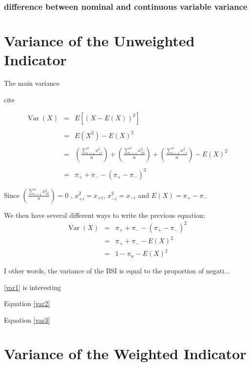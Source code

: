 \documentclass[12pt,a4paper,oneside]{book}
\DeclareMathOperator{\Var}{Var}
\begin{document}
\subsubsection{difference between nominal and continuous variable variance}


\section{Variance of the Unweighted Indicator}

The main variance

cite

\begin{eqnarray}
     \Var(X) &=& E \left[ \left(X-E(X) \right)^2 \right] \nonumber \\ \nonumber \\
     &=& E\left( X^2\right) - E\left( X\right)^2 \nonumber \\ \nonumber \\
     &=& \left( \frac{\sum_{i=1}^n x_{+i}^2}{n} \right) + \left( \frac{\sum_{i=1}^n x_{Ni}^2}{n} \right) + \left( \frac{\sum_{i=1}^n x_{-i}^2}{n} \right) - E(X)^2  \nonumber \\ \nonumber \\
     &=& \pi_+ + \pi_- - ( \pi_+ - \pi_- )^2 \label{var1}
\end{eqnarray}

Since $\left( \frac{\sum_{i=1}^n x_{Ni}^2}{n} \right) = 0$ ,
$x_{+i}^2 = x_{+i}$, $x_{-i}^2 = x_{-i}$
and $E(X) = \pi_+ - \pi_-$


We then have several different ways to write the previous equation;
\begin{eqnarray}
\Var(X) &=& \pi_+ + \pi_- - ( \pi_+ - \pi_- )^2 \nonumber \\
	&=& \pi_+ + \pi_- - E ( X )^2 \label{var2} \\
	&=& 1 - \pi_n - E(X)^2 \label{var3}
\end{eqnarray}

I other words, the variance of the BSI is equal to the proportion of negati...

\autoref{var1} is interesting 

Equation \ref{var2}

Equation \ref{var3}




\section{Variance of the Weighted Indicator}
\end{document}
